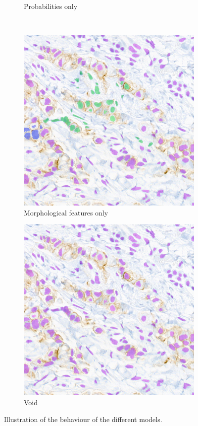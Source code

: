 \begin{figure}[H]
\begin{subfigure}[b]{0.45\textwidth}
    \caption{Probabilities only}
    \label{fig:breast-no-morph2}
  \end{subfigure}
  \\
  \begin{subfigure}[b]{0.45\textwidth}
    \includegraphics[width=\textwidth]{imgs/qual/breast/no-prior2.png}
    \caption{Morphological features only}
    \label{fig:breast-no-prior2}
  \end{subfigure}
  \hfill
  \begin{subfigure}[b]{0.45\textwidth}
    \includegraphics[width=\textwidth]{imgs/qual/breast/void2.png}
    \caption{Void}
    \label{fig:breast-void2}
  \end{subfigure}
  \caption{Illustration of the behaviour of the different models.}
  \label{fig:breast-qual2}
\end{figure}


